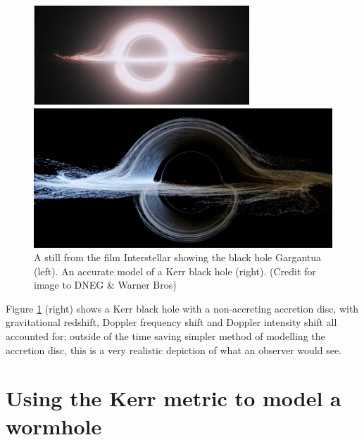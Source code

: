 \documentclass[oneside,openright,frontopenright, singlespacing]{dmathesis}
\begin{document}
\vspace{1em}
\begin{figure}[!ht]
	\centering
	\begin{minipage}{0.5\textwidth}
		\centering
		\includegraphics[width=0.9\linewidth]{img/used-kerr}
	\end{minipage}%
	\hfill
	\begin{minipage}{0.5\textwidth}
		\centering
		\includegraphics[width=0.9\linewidth]{img/realistic-kerr}
	\end{minipage}
	\caption{A still from the film Interstellar showing the black hole Gargantua (left). An accurate model of a Kerr black hole (right). (Credit for image to DNEG \& Warner Bros)}
	\label{fig:Figure5.2}
\end{figure}

\vspace{1em}
	Figure \ref{fig:Figure5.2} (right) shows a Kerr black hole with a non-accreting accretion disc, with gravitational redshift, Doppler frequency shift and Doppler intensity shift all accounted for; outside of the time saving simpler method of modelling the accretion disc, this is a very realistic depiction of what an observer would see.





\chapter{Using the Kerr metric to model a wormhole}\label{chap:Chapter6}
\end{document}
